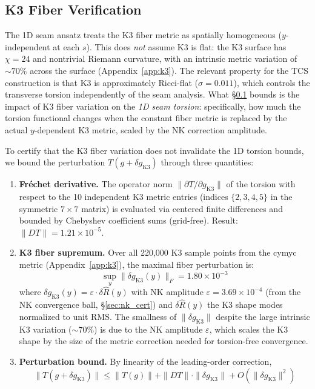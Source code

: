 \documentclass[11pt,a4paper]{article}
\newcommand{\norm}[1]{\|#1\|}
\theoremstyle{remark}
\begin{document}
\subsection{K3 Fiber Verification}\label{sec:k3_fiber}

The 1D seam ansatz treats the K3 fiber metric as spatially homogeneous ($y$-independent
at each $s$). This does \textit{not} assume K3 is flat: the K3 surface has $\chi = 24$ and
nontrivial Riemann curvature, with an intrinsic metric variation of ${\sim}70\%$ across the
surface (Appendix~\ref{app:k3}). The relevant property for the TCS construction is that K3 is
approximately Ricci-flat ($\sigma = 0.011$), which controls the transverse torsion
independently of the seam analysis. What \S\ref{sec:k3_fiber} bounds is the impact of K3 fiber
variation on the \textit{1D seam torsion}: specifically, how much the torsion functional
changes when the constant fiber metric is replaced by the actual $y$-dependent K3 metric,
scaled by the NK correction amplitude.

To certify that the K3 fiber variation does not invalidate the 1D torsion bounds,
we bound the perturbation $T(g + \delta g_{\mathrm{K3}})$ through three quantities:

\begin{enumerate}
    \item \textbf{Fr\'echet derivative.} The operator norm $\norm{\partial T / \partial g_{\mathrm{K3}}}$ of the torsion with
          respect to the 10 independent K3 metric entries (indices $\{2, 3, 4, 5\}$ in the
          symmetric $7 \times 7$ matrix) is evaluated via centered finite differences and bounded
          by Chebyshev coefficient sums (grid-free). Result: $\norm{DT} = 1.21 \times 10^{-5}$.

    \item \textbf{K3 fiber supremum.} Over all 220,000 K3 sample points from the cymyc metric
          (Appendix~\ref{app:k3}), the maximal fiber perturbation is:
          \begin{equation}\label{eq:k3_sup}
          \sup_y \norm{\delta g_{\mathrm{K3}}(y)}_F = 1.80 \times 10^{-3}
          \end{equation}
          where $\delta g_{\mathrm{K3}}(y) = \varepsilon \cdot \delta\hat{R}(y)$ with NK amplitude $\varepsilon = 3.69 \times 10^{-4}$ (from the NK
          convergence ball, \S\ref{sec:nk_cert}) and $\delta\hat{R}(y)$ the K3 shape modes normalized to unit RMS.
          The smallness of $\norm{\delta g_{\mathrm{K3}}}$ despite the large intrinsic K3 variation (${\sim}70\%$) is
          due to the NK amplitude $\varepsilon$, which scales the K3 shape by the size of the metric
          correction needed for torsion-free convergence.

    \item \textbf{Perturbation bound.} By linearity of the leading-order correction,
          \begin{equation}\label{eq:k3_pert}
          \norm{T(g + \delta g_{\mathrm{K3}})} \leq \norm{T(g)} + \norm{DT} \cdot \norm{\delta g_{\mathrm{K3}}} + O(\norm{\delta g_{\mathrm{K3}}}^2)
          \end{equation}
\end{enumerate}
\end{document}
